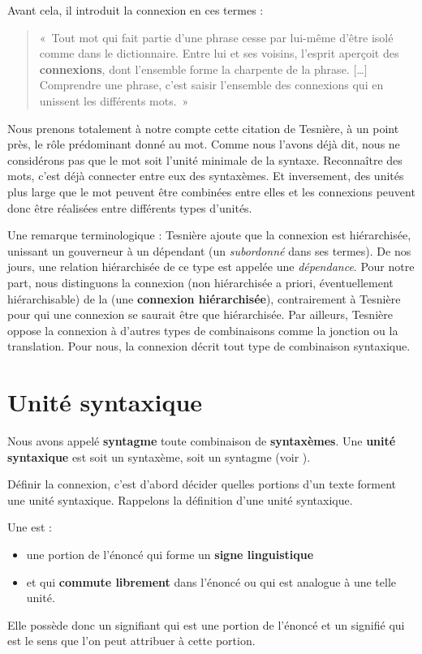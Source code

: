 Avant cela, il introduit la connexion en ces termes :
\begin{quote}
    «~Tout mot qui fait partie d’une phrase cesse par lui-même d’être isolé comme dans le dictionnaire. Entre lui et ses voisins, l’esprit aperçoit des \textbf{connexions}, dont l’ensemble forme la charpente de la phrase. […] Comprendre une phrase, c’est saisir l’ensemble des connexions qui en unissent les différents mots.~»
\end{quote}
Nous prenons totalement à notre compte cette citation de Tesnière, à un point près, le rôle prédominant donné au mot. Comme nous l’avons déjà dit, nous ne considérons pas que le mot soit l’unité minimale de la syntaxe. Reconnaître des mots, c’est déjà connecter entre eux des syntaxèmes. Et inversement, des unités plus large que le mot peuvent être combinées entre elles et les connexions peuvent donc être réalisées entre différents types d’unités.

Une remarque terminologique : Tesnière ajoute que la connexion est hiérarchisée, unissant un gouverneur à un dépendant (un \textit{subordonné} dans ses termes). De nos jours, une relation hiérarchisée de ce type est appelée une \textit{dépendance}. Pour notre part, nous distinguons la connexion (non hiérarchisée a priori, éventuellement hiérarchisable) de la  (une \textbf{connexion hiérarchisée}), contrairement à Tesnière pour qui une connexion se saurait être que hiérarchisée. Par ailleurs, Tesnière oppose la connexion à d’autres types de combinaisons comme la jonction ou la translation. Pour nous, la connexion décrit tout type de combinaison syntaxique.

\section{Unité syntaxique}\label{sec:3.2.9}

Nous avons appelé \textbf{syntagme} toute combinaison de \textbf{syntaxèmes}. Une \textbf{unité syntaxique} est soit un syntaxème, soit un syntagme (voir ).

Définir la connexion, c’est d’abord décider quelles portions d’un texte forment une unité syntaxique. Rappelons la définition d’une unité syntaxique.

{Une  est :

   \begin{itemize}
   \item une portion de l’énoncé qui forme un \textbf{signe linguistique}
   \item et qui \textbf{commute librement} dans l’énoncé ou qui est analogue à une telle unité.
   \end{itemize}
Elle possède donc un signifiant qui est une portion de l’énoncé et un signifié qui est le sens que l’on peut attribuer à cette portion.}

